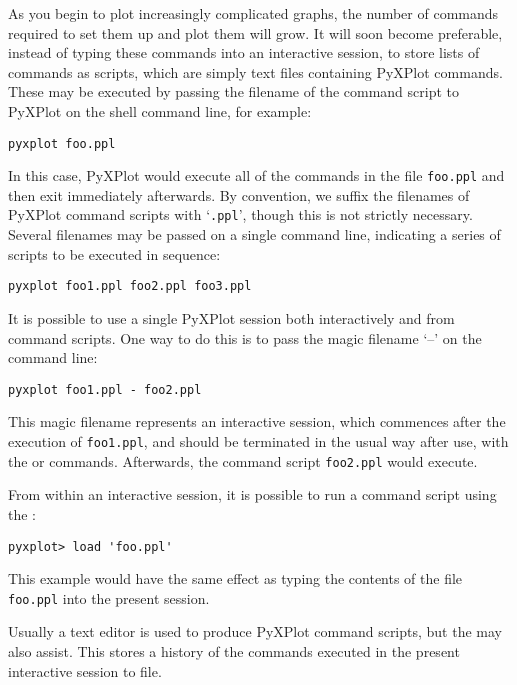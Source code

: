 As you begin to plot increasingly complicated graphs, the number of commands
required to set them up and plot them will grow.  It will soon become
preferable, instead of typing these commands into an interactive session, to
store lists of commands as scripts, which are simply text files containing
PyXPlot commands. These may be executed by passing the filename of the command
script to PyXPlot on the shell command line, for example:

\begin{verbatim}
pyxplot foo.ppl
\end{verbatim}

\noindent In this case, PyXPlot would execute all of the commands in the file
{\tt foo.ppl} and then exit immediately afterwards.  By convention, we suffix
the filenames of PyXPlot command scripts with `{\tt .ppl}', though this is not
strictly necessary. Several filenames may be passed on a single command line,
indicating a series of scripts to be executed in sequence:

\begin{verbatim}
pyxplot foo1.ppl foo2.ppl foo3.ppl
\end{verbatim}

It is possible to use a single PyXPlot session both interactively and from
command scripts. One way to do this is to pass the magic filename `--' on the
command line:

\begin{verbatim}
pyxplot foo1.ppl - foo2.ppl
\end{verbatim}

\noindent This magic filename represents an interactive session, which
commences after the execution of {\tt foo1.ppl}, and should be terminated in
the usual way after use, with the  or  commands.
Afterwards, the command script {\tt foo2.ppl} would execute.

From within an interactive session, it is possible to run a command script
using the :

\begin{verbatim}
pyxplot> load 'foo.ppl'
\end{verbatim}

\noindent This example would have the same effect as typing the contents of the
file {\tt foo.ppl} into the present session.

Usually a text editor is used to produce PyXPlot command scripts, but the
 may also assist. This stores a history of the commands executed
in the present interactive session to file.

